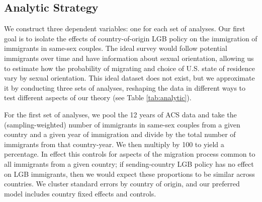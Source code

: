 \documentclass[
  12pt,
]{article}
\begin{document}
\hypertarget{analytic-strategy}{%
\subsection{Analytic Strategy}\label{analytic-strategy}}

We construct three dependent variables: one for each set of analyses. Our first goal is to isolate the effects of country-of-origin LGB policy on the immigration of immigrants in same-sex couples. The ideal survey would follow potential immigrants over time and have information about sexual orientation, allowing us to estimate how the probability of migrating and choice of U.S. state of residence vary by sexual orientation. This ideal dataset does not exist, but we approximate it by conducting three sets of analyses, reshaping the data in different ways to test different aspects of our theory (see Table \ref{tab:analytic}).

For the first set of analyses, we pool the 12 years of ACS data and take the (sampling-weighted) number of immigrants in same-sex couples from a given country and a given year of immigration and divide by the total number of immigrants from that country-year. We then multiply by 100 to yield a percentage. In effect this controls for aspects of the migration process common to all immigrants from a given country; if sending-country LGB policy has no effect on LGB immigrants, then we would expect these proportions to be similar across countries. We cluster standard errors by country of origin, and our preferred model includes country fixed effects and controls.

 
  \providecommand{\huxb}[2]{\arrayrulecolor[RGB]{#1}\global\arrayrulewidth=#2pt}
  \providecommand{\huxvb}[2]{\color[RGB]{#1}\vrule width #2pt}
  \providecommand{\huxtpad}[1]{\rule{0pt}{#1}}
  \providecommand{\huxbpad}[1]{\rule[-#1]{0pt}{#1}}
\end{document}
